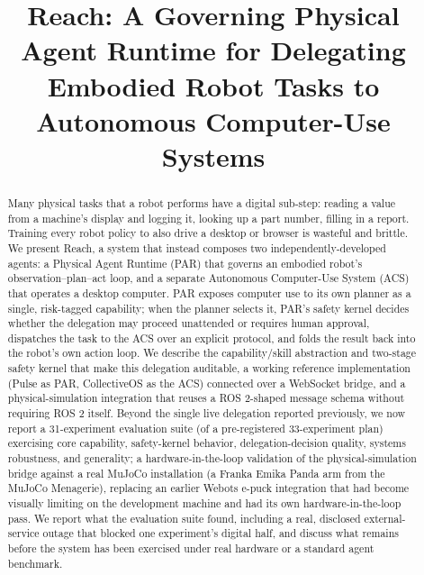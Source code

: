 \documentclass[conference]{IEEEtran}
\begin{document}
\title{Reach: A Governing Physical Agent Runtime for Delegating\\
Embodied Robot Tasks to Autonomous Computer-Use Systems}

\author{
}

\maketitle

\begin{abstract}
Many physical tasks that a robot performs have a digital sub-step: reading a value from a machine's
display and logging it, looking up a part number, filling in a report. Training every robot policy to also
drive a desktop or browser is wasteful and brittle. We present Reach, a system that instead composes
two independently-developed agents: a Physical Agent Runtime (PAR) that governs an embodied robot's
observation--plan--act loop, and a separate Autonomous Computer-Use System (ACS) that operates a
desktop computer. PAR exposes computer use to its own planner as a single, risk-tagged capability;
when the planner selects it, PAR's safety kernel decides whether the delegation may proceed unattended
or requires human approval, dispatches the task to the ACS over an explicit protocol, and folds the
result back into the robot's own action loop. We describe the capability/skill abstraction and two-stage
safety kernel that make this delegation auditable, a working reference implementation (Pulse as PAR,
CollectiveOS as the ACS) connected over a WebSocket bridge, and a physical-simulation integration that
reuses a ROS 2-shaped message schema without requiring ROS 2 itself. Beyond the single live delegation
reported previously, we now report a 31-experiment evaluation suite (of a pre-registered 33-experiment
plan) exercising core capability, safety-kernel behavior, delegation-decision quality, systems robustness,
and generality; a hardware-in-the-loop validation of the physical-simulation bridge against a real
MuJoCo installation (a Franka Emika Panda arm from the MuJoCo Menagerie), replacing an earlier Webots
e-puck integration that had become visually limiting on the development machine and had its own
hardware-in-the-loop pass. We report what the evaluation suite found, including a real, disclosed
external-service outage that blocked one experiment's digital half, and discuss what remains before the
system has been exercised under real hardware or a standard agent benchmark.
\end{abstract}
\end{document}
